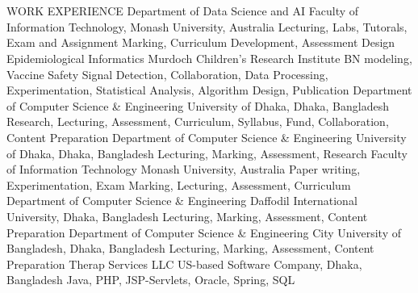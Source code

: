 \section{\faPencil}{WORK EXPERIENCE}
%
    {Department of Data Science and AI}%
    {Faculty of Information Technology, Monash University, Australia}
    {Lecturing, Labs, Tutorals, Exam and Assignment Marking, Curriculum Development, Assessment Design}
\vspace{-8pt}
%
    {Epidemiological Informatics}%
    {Murdoch Children's Research Institute}
    {BN modeling, Vaccine Safety Signal Detection, Collaboration, Data Processing, Experimentation, Statistical Analysis, Algorithm Design, Publication}
\vspace{-8pt}    
%
    {Department of Computer Science \& Engineering}%
    {University of Dhaka, Dhaka, Bangladesh}
    {Research, Lecturing, Assessment, Curriculum, Syllabus, Fund, Collaboration, Content Preparation}
\vspace{-8pt}    
%
    {Department of Computer Science \& Engineering}%
    {University of Dhaka, Dhaka, Bangladesh}
    {Lecturing, Marking, Assessment, Research}
\vspace{-3pt}    
%
    {Faculty of Information Technology}
    {Monash University, Australia}%
    {Paper writing, Experimentation, Exam Marking, Lecturing, Assessment, Curriculum}
\vspace{-3pt}    
%
    {Department of Computer Science \& Engineering}%
    {Daffodil International University, Dhaka, Bangladesh}
    {Lecturing, Marking, Assessment, Content Preparation}
\vspace{-8pt}    
%
    {Department of Computer Science \& Engineering}%
    {City University of Bangladesh, Dhaka, Bangladesh}
    {Lecturing, Marking, Assessment, Content Preparation}
\vspace{-8pt}    
%
    {Therap Services LLC}%
    {US-based Software Company, Dhaka, Bangladesh}
    {Java, PHP, JSP-Servlets, Oracle, Spring, SQL}